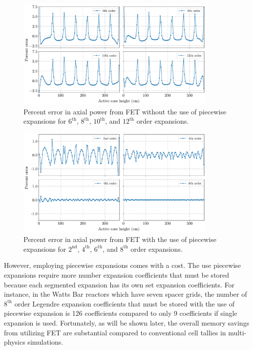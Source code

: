 \begin{figure}
    \centering
    \includegraphics[width=0.88\textwidth]{figs/no_piecewise.pdf}
    \caption[Percent error in axial power from FET without the use of piecewise expansions.]{Percent error in axial power from FET without the use of piecewise expansions for $6^\text{th}$, $8^\text{th}$, $10^\text{th}$, and $12^\text{th}$ order expansions.}
    \label{fig_21y}
\end{figure}

\begin{figure}
    \centering
    \includegraphics[width=0.88\textwidth]{figs/piecewise.pdf}
    \caption[Percent error in axial power from FET with the use of piecewise expansions.]{Percent error in axial power from FET with the use of piecewise expansions for $2^\text{nd}$, $4^\text{th}$, $6^\text{th}$, and $8^\text{th}$ order expansions.}
    \label{fig_21z}
\end{figure}

However, employing piecewise expansions comes with a cost. The use piecewise expansions require more number expansion coefficients that must be stored because each segmented expansion has its own set expansion coefficients. For instance, in the Watts Bar reactors which have seven spacer grids, the number of $8^\text{th}$ order Legendre expansion coefficients that must be stored with the use of piecewise expansion is 126 coefficients compared to only 9 coefficients if single expansion is used. Fortunately, as will be shown later, the overall memory savings from utilizing FET are substantial compared to conventional cell tallies in multi-physics simulations.

